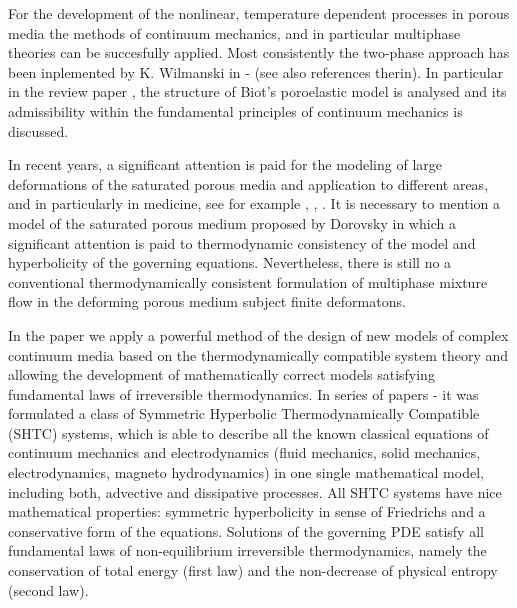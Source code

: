 \documentclass[3p,times]{elsarticle}
\begin{document}
For the development of the nonlinear, temperature dependent processes in porous media the methods of continuum mechanics, and in particular multiphase theories can be succesfully applied. 
Most consistently the two-phase approach has been inplemented by K. Wilmanski in \cite{Wilmanski1998}-\cite{Wilmanski2006} (see also references therin). In particular in the review paper \cite{Wilmanski2006}, the structure of Biot's poroelastic model is analysed and its admissibility within the fundamental principles of continuum mechanics is discussed. 

In recent years, a significant attention is paid for the modeling of large deformations of the saturated porous media and application to different areas, and in particularly in medicine, see
for example \cite{Khoei2011}, \cite{Rohan2017}, \cite{Pesavento2017}.
It is necessary to mention a model of the saturated porous medium proposed by Dorovsky \cite{Dorovsky} in which a significant attention is paid to thermodynamic consistency of the model and hyperbolicity of the governing equations. 
Nevertheless, there is still no a conventional thermodynamically consistent formulation of multiphase mixture flow in the  deforming porous medium subject finite deformatons. 

In the paper we apply a powerful method of the design of new models of complex continuum media  based on the thermodynamically compatible system theory and allowing the development of mathematically correct models satisfying fundamental laws of irreversible thermodynamics. 
In series of papers \cite{} - \cite{} it was formulated a class of Symmetric Hyperbolic Thermodynamically Compatible (SHTC) systems, which is able to describe all the known classical equations of continuum mechanics and electrodynamics (fluid mechanics, solid mechanics, electrodynamics, magneto hydrodynamics) in one single mathematical model, including both, advective and dissipative processes. All SHTC systems have nice mathematical properties: symmetric hyperbolicity in sense of Friedrichs and a conservative form of the equations. Solutions of the governing PDE satisfy all fundamental laws of non-equilibrium irreversible thermodynamics, namely the conservation of total energy (first law) and the non-decrease of physical entropy (second law). 
\end{document}
